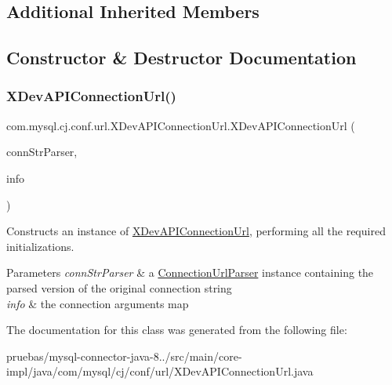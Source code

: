 \subsection*{Additional Inherited Members}


\subsection{Constructor \& Destructor Documentation}
\mbox{\label{classcom_1_1mysql_1_1cj_1_1conf_1_1url_1_1_x_dev_a_p_i_connection_url_a81df74119f400043949eb96ebec792e0}} 
\subsubsection{\texorpdfstring{X\+Dev\+A\+P\+I\+Connection\+Url()}{XDevAPIConnectionUrl()}}
{\footnotesize\ttfamily com.\+mysql.\+cj.\+conf.\+url.\+X\+Dev\+A\+P\+I\+Connection\+Url.\+X\+Dev\+A\+P\+I\+Connection\+Url (\begin{DoxyParamCaption}\item[{\mbox{\hyperlink{classcom_1_1mysql_1_1cj_1_1conf_1_1_connection_url_parser}{Connection\+Url\+Parser}}}]{conn\+Str\+Parser,  }\item[{Properties}]{info }\end{DoxyParamCaption})}

Constructs an instance of \mbox{\hyperlink{classcom_1_1mysql_1_1cj_1_1conf_1_1url_1_1_x_dev_a_p_i_connection_url}{X\+Dev\+A\+P\+I\+Connection\+Url}}, performing all the required initializations.


\begin{DoxyParams}{Parameters}
{\em conn\+Str\+Parser} & a \mbox{\hyperlink{classcom_1_1mysql_1_1cj_1_1conf_1_1_connection_url_parser}{Connection\+Url\+Parser}} instance containing the parsed version of the original connection string \\
\hline
{\em info} & the connection arguments map \\
\hline
\end{DoxyParams}


The documentation for this class was generated from the following file\+:\begin{DoxyCompactItemize}
\item 
pruebas/mysql-\/connector-\/java-\/8../src/main/core-\/impl/java/com/mysql/cj/conf/url/X\+Dev\+A\+P\+I\+Connection\+Url.\+java\end{DoxyCompactItemize}
